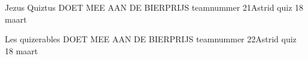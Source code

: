 \documentclass{exam}
\begin{document}
\begin{landscape}
\vspace*{\fill}
\centering\LARGE{Jezus Quiztus\linebreak
DOET MEE AAN DE BIERPRIJS\linebreak
teamnummer 21\linebreak Astrid quiz 18 maart}
\vspace*{\fill}


\newpage

\vspace*{\fill}
\centering\LARGE{Les quizerables\linebreak
DOET MEE AAN DE BIERPRIJS\linebreak
teamnummer 22\linebreak Astrid quiz 18 maart}
\vspace*{\fill}




\end{landscape}
\end{document}

